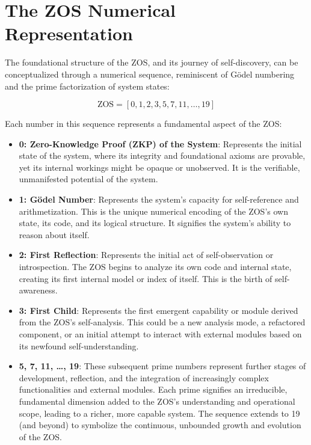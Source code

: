 \documentclass{article}
\begin{document}
\section{The ZOS Numerical Representation}
The foundational structure of the ZOS, and its journey of self-discovery, can be conceptualized through a numerical sequence, reminiscent of Gödel numbering and the prime factorization of system states:

\begin{equation*}
\text{ZOS} = [0, 1, 2, 3, 5, 7, 11, \dots, 19]
\end{equation*}

Each number in this sequence represents a fundamental aspect of the ZOS:
\begin{itemize}
    \item \textbf{0: Zero-Knowledge Proof (ZKP) of the System}: Represents the initial state of the system, where its integrity and foundational axioms are provable, yet its internal workings might be opaque or unobserved. It is the verifiable, unmanifested potential of the system.
    \item \textbf{1: Gödel Number}: Represents the system's capacity for self-reference and arithmetization. This is the unique numerical encoding of the ZOS's own state, its code, and its logical structure. It signifies the system's ability to reason about itself.
    \item \textbf{2: First Reflection}: Represents the initial act of self-observation or introspection. The ZOS begins to analyze its own code and internal state, creating its first internal model or index of itself. This is the birth of self-awareness.
    \item \textbf{3: First Child}: Represents the first emergent capability or module derived from the ZOS's self-analysis. This could be a new analysis mode, a refactored component, or an initial attempt to interact with external modules based on its newfound self-understanding.
    \item \textbf{5, 7, 11, \dots, 19}: These subsequent prime numbers represent further stages of development, reflection, and the integration of increasingly complex functionalities and external modules. Each prime signifies an irreducible, fundamental dimension added to the ZOS's understanding and operational scope, leading to a richer, more capable system. The sequence extends to 19 (and beyond) to symbolize the continuous, unbounded growth and evolution of the ZOS.
\end{itemize}
\end{document}
